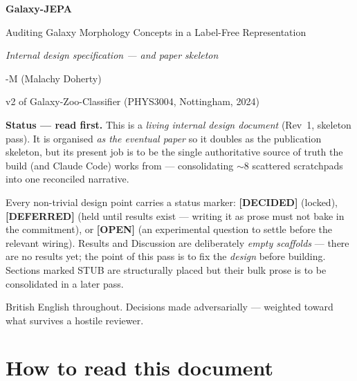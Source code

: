\documentclass[11pt,a4paper]{article}
\newcommand{\dec}{\textcolor{decided}{\sffamily\bfseries[DECIDED]}}
\newcommand{\dfr}{\textcolor{deferred}{\sffamily\bfseries[DEFERRED]}}
\newcommand{\opn}{\textcolor{openq}{\sffamily\bfseries[OPEN]}}
\begin{document}
\begin{titlepage}
\centering
\vspace*{2cm}
{\Huge\bfseries\sffamily Galaxy-JEPA\par}
\vspace{0.6cm}
{\Large Auditing Galaxy Morphology Concepts in a Label-Free Representation\par}
\vspace{0.4cm}
{\large\itshape Internal design specification --- and paper skeleton\par}
\vspace{2cm}
{\large -M (Malachy Doherty)\par}
\vspace{0.3cm}
{v2 of Galaxy-Zoo-Classifier (PHYS3004, Nottingham, 2024)\par}
\vspace{2cm}

\begin{tcolorbox}[width=0.85\textwidth,colback=rulegrey!8,colframe=rulegrey,boxrule=0.6pt]
\small
\textbf{\sffamily Status — read first.} This is a \emph{living internal design document}
(Rev~1, skeleton pass). It is organised \emph{as the eventual paper} so it doubles as the
publication skeleton, but its present job is to be the single authoritative source of truth
the build (and Claude Code) works from --- consolidating $\sim$8 scattered scratchpads into
one reconciled narrative.

\smallskip
Every non-trivial design point carries a status marker: \dec{} (locked),
\dfr{} (held until results exist --- writing it as prose must not bake in the commitment),
or \opn{} (an experimental question to settle before the relevant wiring). Results and
Discussion are deliberately \emph{empty scaffolds} --- there are no results yet; the point of
this pass is to fix the \emph{design} before building. Sections marked \textsf{STUB} are
structurally placed but their bulk prose is to be consolidated in a later pass.
\end{tcolorbox}

\vfill
{\small British English throughout. Decisions made adversarially --- weighted toward what
survives a hostile reviewer.\par}
\end{titlepage}

\tableofcontents
\newpage

\section{How to read this document}
\end{document}
